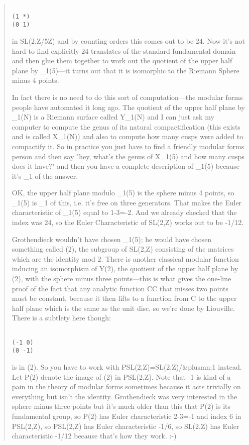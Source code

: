 \begin{quote}
\begin{verbatim}

(1 *)
(0 1)
\end{verbatim}
    
 in SL(2,Z/5Z) and by counting
 orders this comes out to be 24. Now it's not hard to find explicitly
 24 translates of the standard fundamental domain and then glue
 them together to work out the quotient of the upper half plane
 by \Gamma _{1}(5)---it turns out that it is isomorphic to the
 Riemann Sphere minus 4 points.

 In fact there is no need to do this sort of computation---the modular
 forms people have automated it long ago. The quotient of the upper
 half plane by \Gamma _{1}(N) is a Riemann surface called
 Y_{1}(N) and I can just ask my computer to compute the genus
 of its natural compactification (this exists and is called
 X_{1}(N)) and also to compute how many cusps were added to
 compactify it.  So in practice you just have to find a friendly
 modular forms person and then say "hey, what's the genus of
 X_{1}(5) and how many cusps does it have?" and then you have
 a complete description of \Gamma _{1}(5) because it's
 \pi _{1} of the answer.
 
 OK, the upper half plane modulo \Gamma _{1}(5) is the sphere
 minus 4 points, so \Gamma _{1}(5) is \pi _{1} of this,
 i.e. it's free on three generators.  That makes the Euler
 characteristic of \Gamma _{1}(5) equal to 1-3=-2.  And we
 already checked that the index was 24, so the Euler Characteristic of
 SL(2,Z) works out to be -1/12.
 
 Grothendieck wouldn't have chosen \Gamma _{1}(5); he would have chosen
 something called \Gamma (2), the subgroup of SL(2,Z) consisting
 of the matrices which are the identity mod 2. There is another
 classical modular function \lambda  inducing an isomorphism
 of Y(2), the quotient of the upper half plane by \Gamma (2),
 with the sphere minus three points---this is what gives
 the one-line proof of the fact that any analytic function C\to C
 that misses two points must be constant, because it then lifts
 to a function from C to the upper half plane which is the same
 as the unit disc, so we're done by Liouville. There is a subtlety
 here though: 

\begin{verbatim}

(-1 0)
(0 -1)
\end{verbatim}
    
 is in \Gamma (2). So you have to work
 with PSL(2,Z)=SL(2,Z)/{&plusmn;1} instead. Let P\Gamma (2) denote the image
 of \Gamma (2) in PSL(2,Z). Note that -1 is kind of a pain in the
 theory of modular forms sometimes because it acts trivially on
 everything but isn't the identity. Grothendieck was very interested
 in the sphere minus three points but it's much older than this
 that P\Gamma (2) is its fundamental group, so P\Gamma (2) has
 Euler characteristic 2-3=-1 and index 6 in PSL(2,Z), so PSL(2,Z)
 has Euler characteristic -1/6, so SL(2,Z) has Euler characteristic
 -1/12 because that's how they work. :-)


\end{quote}
